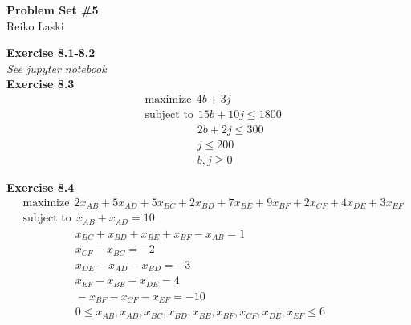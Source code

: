 \documentclass[letterpaper,12pt]{article}
\theoremstyle{definition}
\begin{document}
\begin{flushleft}
  \textbf{\large{Problem Set \#5}} \\
  Reiko Laski
\end{flushleft}

\textbf{Exercise 8.1-8.2} \\
\textit{See jupyter notebook} \\

\textbf{Exercise 8.3}
\begin{align*}
  &\text{maximize} \ \ 4b + 3j \\
  &\text{subject to} \ \ 15b + 10j \leq 1800 \\
  &\qquad \qquad \ \ \  2b + 2j \leq 300 \\
  &\qquad \qquad \ \ \  j \leq 200 \\
  &\qquad \qquad \ \ \  b, j \geq 0
\end{align*}

\textbf{Exercise 8.4}
\begin{align*}
  &\text{maximize} \ \ 2x_{AB} + 5x_{AD} + 5x_{BC} + 2x_{BD} + 7x_{BE} + 9x_{BF} + 2x_{CF} + 4x_{DE} + 3x_{EF} \\
  &\text{subject to} \ \ x_{AB} + x_{AD} = 10 \\
  &\qquad \qquad \ \ \ x_{BC} + x_{BD} + x_{BE} + x_{BF} - x_{AB} = 1 \\
  &\qquad \qquad \ \ \ x_{CF} - x_{BC} = -2 \\
  &\qquad \qquad \ \ \ x_{DE} - x_{AD} - x_{BD} = -3 \\
  &\qquad \qquad \ \ \ x_{EF} - x_{BE} - x_{DE} = 4 \\
  &\qquad \qquad \ \ \ -x_{BF} - x_{CF} - x_{EF} = -10 \\
  &\qquad \qquad \ \ \ 0 \leq x_{AB}, x_{AD}, x_{BC}, x_{BD}, x_{BE}, x_{BF}, x_{CF}, x_{DE}, x_{EF} \leq 6
\end{align*}
\end{document}
